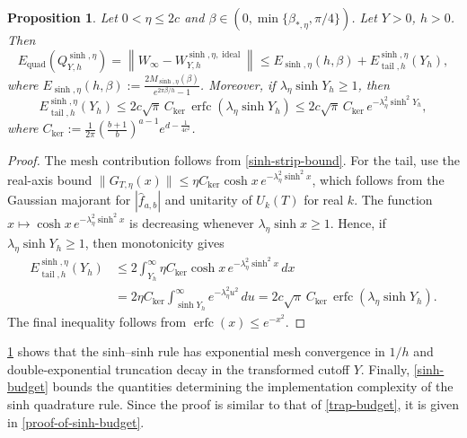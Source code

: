 \documentclass[10pt,reqno]{article}
\numberwithin{equation}{section}
\theoremstyle{plain}
\newtheorem{prop}[thm]{Proposition}
\theoremstyle{definition}
\begin{document}
\begin{prop}\label{sinh-lattice-quadrature}
Let \(0<\eta\le 2c\) and \(\beta\in(0,\min\{\beta_{\ast,\eta},\pi/4\})\). Let \(Y>0\), \(h>0\). Then
\begin{equation}\label{eq:sinh-lattice-error}
E_{\operatorname{quad}}(Q_{Y,h}^{\operatorname{sinh},\eta}) = \left\|W_\infty-W_{Y,h}^{\operatorname{sinh},\eta,\operatorname{ideal}}\right\| \le E_{\operatorname{sinh},\eta}(h,\beta)+E_{\operatorname{tail},h}^{\operatorname{sinh},\eta}(Y_h),
\end{equation}
where \(E_{\operatorname{sinh},\eta}(h,\beta):=\frac{2M_{\operatorname{sinh},\eta}(\beta)}{e^{2\pi\beta/h}-1}\). Moreover, if \(\lambda_\eta\sinh Y_h\ge1\), then
\begin{equation}\label{eq:sinh-tail-bound}
E_{\operatorname{tail},h}^{\operatorname{sinh},\eta}(Y_h) \le 2c\sqrt{\pi}\,C_{\operatorname{ker}}\,\operatorname{erfc}(\lambda_\eta\sinh Y_h) \le 2c\sqrt{\pi}\,C_{\operatorname{ker}}\,e^{-\lambda_\eta^2\sinh^2 Y_h},
\end{equation}
where \(C_{\operatorname{ker}}:=\frac{1}{2\pi}\left(\frac{b+1}{b}\right)^{a-1}e^{d-\frac{1}{4c^2}}\).
\end{prop}

\begin{proof}
The mesh contribution follows from \cref{sinh-strip-bound}. For the tail, use the real-axis bound \(\|G_{T,\eta}(x)\|\le \eta C_{\operatorname{ker}}\cosh x\,e^{-\lambda_\eta^2\sinh^2x}\), which follows from the Gaussian majorant for \(|\hat f_{a,b}|\) and unitarity of \(U_k(T)\) for real \(k\). The function \(x\mapsto \cosh x\,e^{-\lambda_\eta^2\sinh^2x}\) is decreasing whenever \(\lambda_\eta\sinh x\ge1\). Hence, if \(\lambda_\eta\sinh Y_h\ge1\), then monotonicity gives
\begin{align}
E_{\operatorname{tail},h}^{\operatorname{sinh},\eta}(Y_h) &\le 2\int_{Y_h}^{\infty}\eta C_{\operatorname{ker}}\cosh x\,e^{-\lambda_\eta^2\sinh^2x}\,dx \\
&= 2\eta C_{\operatorname{ker}}\int_{\sinh Y_h}^{\infty}e^{-\lambda_\eta^2u^2}\,du = 2c\sqrt{\pi}\,C_{\operatorname{ker}}\,\operatorname{erfc}(\lambda_\eta\sinh Y_h).
\end{align}
The final inequality follows from \(\operatorname{erfc}(x)\le e^{-x^2}\).
\end{proof}

\cref{sinh-lattice-quadrature} shows that the sinh--sinh rule has exponential mesh convergence in \(1/h\) and double-exponential truncation decay in the transformed cutoff \(Y\). Finally, \cref{sinh-budget} bounds the quantities determining the implementation complexity of the sinh quadrature rule. Since the proof is similar to that of \cref{trap-budget}, it is given in \cref{proof-of-sinh-budget}.
\end{document}
